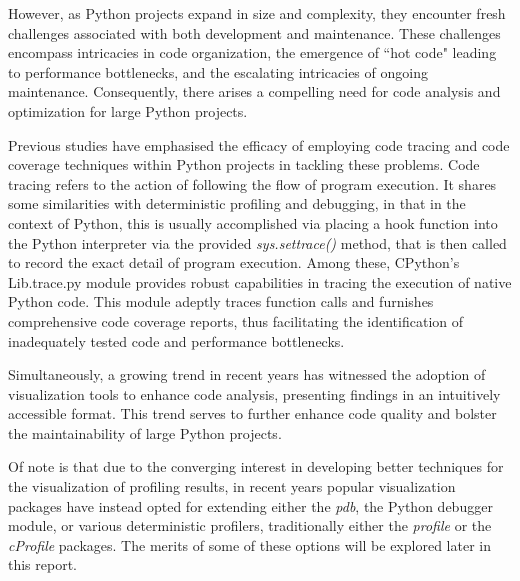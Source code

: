 \documentclass[conference]{IEEEtran}
\begin{document}
However, as Python projects expand in size and complexity, they encounter fresh challenges associated with both development and maintenance. These challenges encompass intricacies in code organization, the emergence of ``hot code" leading to performance bottlenecks, and the escalating intricacies of ongoing maintenance\cite{peng2021empirical}. Consequently, there arises a compelling need for code analysis and optimization for large Python projects\cite{ray2014large}.

Previous studies have emphasised the efficacy of employing code tracing and code coverage techniques within Python projects in tackling these problems. Code tracing refers to the action of following the flow of program execution. It shares some similarities with deterministic profiling and debugging, in that in the context of Python, this is usually accomplished via placing a hook function into the Python interpreter via the provided \textit{sys.settrace()} method, that is then called to record the exact detail of program execution. Among these, CPython's Lib.trace.py module provides robust capabilities in tracing the execution of native Python code\cite{aakerblom2014tracing}. This module adeptly traces function calls and furnishes comprehensive code coverage reports, thus facilitating the identification of inadequately tested code and performance bottlenecks. \par
 
Simultaneously, a growing trend in recent years has witnessed the adoption of visualization tools to enhance code analysis, presenting findings in an intuitively accessible format\cite{cao2021research,fernandez2023empirical}. This trend serves to further enhance code quality and bolster the maintainability of large Python projects.\par

Of note is that due to the converging interest in developing better techniques for the visualization of profiling results, in recent years popular visualization packages have instead opted for extending either the \textit{pdb}, the Python debugger module, or various deterministic profilers, traditionally either the \textit{profile} or the \textit{cProfile} packages. The merits of some of these options will be explored later in this report.\par
\end{document}
